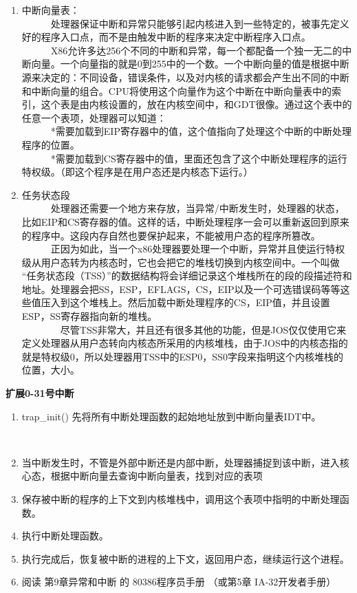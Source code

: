 \begin{ExerciseList}
\begin{enumerate}
\item 中断向量表：\\
  　　　处理器保证中断和异常只能够引起内核进入到一些特定的，被事先定义好的程序入口点，而不是由触发中断的程序来决定中断程序入口点。\\
  　　　X86允许多达256个不同的中断和异常，每一个都配备一个独一无二的中断向量。一个向量指的就是0到255中的一个数。一个中断向量的值是根据中断源来决定的：不同设备，错误条件，以及对内核的请求都会产生出不同的中断和中断向量的组合。CPU将使用这个向量作为这个中断在中断向量表中的索引，这个表是由内核设置的，放在内核空间中，和GDT很像。通过这个表中的任意一个表项，处理器可以知道：\\
　　　*需要加载到EIP寄存器中的值，这个值指向了处理这个中断的中断处理程序的位置。\\
　　　*需要加载到CS寄存器中的值，里面还包含了这个中断处理程序的运行特权级。（即这个程序是在用户态还是内核态下运行。）\\
\item 任务状态段\\
　　　处理器还需要一个地方来存放，当异常/中断发生时，处理器的状态，比如EIP和CS寄存器的值。这样的话，中断处理程序一会可以重新返回到原来的程序中。这段内存自然也要保护起来，不能被用户态的程序所篡改。\\
　　　正因为如此，当一个x86处理器要处理一个中断，异常并且使运行特权级从用户态转为内核态时，它也会把它的堆栈切换到内核空间中。一个叫做 “任务状态段（TSS）”的数据结构将会详细记录这个堆栈所在的段的段描述符和地址。处理器会把SS，ESP，EFLAGS，CS，EIP以及一个可选错误码等等这些值压入到这个堆栈上。然后加载中断处理程序的CS，EIP值，并且设置ESP，SS寄存器指向新的堆栈。\\
　　　　尽管TSS非常大，并且还有很多其他的功能，但是JOS仅仅使用它来定义处理器从用户态转向内核态所采用的内核堆栈，由于JOS中的内核态指的就是特权级0，所以处理器用TSS中的ESP0，SS0字段来指明这个内核堆栈的位置，大小。
\end{enumerate}

\textbf{扩展0-31号中断}

\begin{enumerate}
\item trap\_init() 先将所有中断处理函数的起始地址放到中断向量表IDT中。

  　\item 当中断发生时，不管是外部中断还是内部中断，处理器捕捉到该中断，进入核心态，根据中断向量去查询中断向量表，找到对应的表项
　　\item 保存被中断的程序的上下文到内核堆栈中，调用这个表项中指明的中断处理函数。
　　\item 执行中断处理函数。
\item 执行完成后，恢复被中断的进程的上下文，返回用户态，继续运行这个进程。
\item	阅读 第9章异常和中断 的 80386程序员手册 （或第5章 IA-32开发者手册）
\end{enumerate}


\end{ExerciseList}
